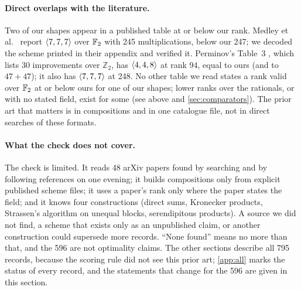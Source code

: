 \paragraph{Direct overlaps with the literature.}
Two of our shapes appear in a published table at or below our rank. Medley et al.\ \cite{medley2026gpu} report $\langle 7,7,7\rangle$ over ${\mathbb{F}_2}$ with 245 multiplications, below our 247; we decoded the scheme printed in their appendix and verified it. Perminov's Table~3 \cite{perminov2025ternary}, which lists 30 improvements over $\mathbb Z_2$, has $\langle 4,4,8\rangle$ at rank 94, equal to ours (and to $47+47$); it also has $\langle 7,7,7\rangle$ at 248.
No other table we read states a rank valid over ${\mathbb{F}_2}$ at or below ours for one of our shapes; lower ranks over the rationals, or with no stated field, exist for some (see above and \cref{sec:comparators}). The prior art that matters is in compositions and in one catalogue file, not in direct searches of these formats.

\paragraph{What the check does not cover.}
The check is limited. It reads 48 arXiv papers found by searching and by following references on one evening; it builds compositions only from explicit published scheme files; it uses a paper's rank only where the paper states the field; and it knows four constructions (direct sums, Kronecker products, Strassen's algorithm on unequal blocks, serendipitous products). A source we did not find, a scheme that exists only as an unpublished claim, or another construction could supersede more records. ``None found'' means no more than that, and the 596 are not optimality claims.
The other sections describe all 795 records, because the scoring rule did not see this prior art; \cref{app:all} marks the status of every record, and the statements that change for the 596 are given in this section.
